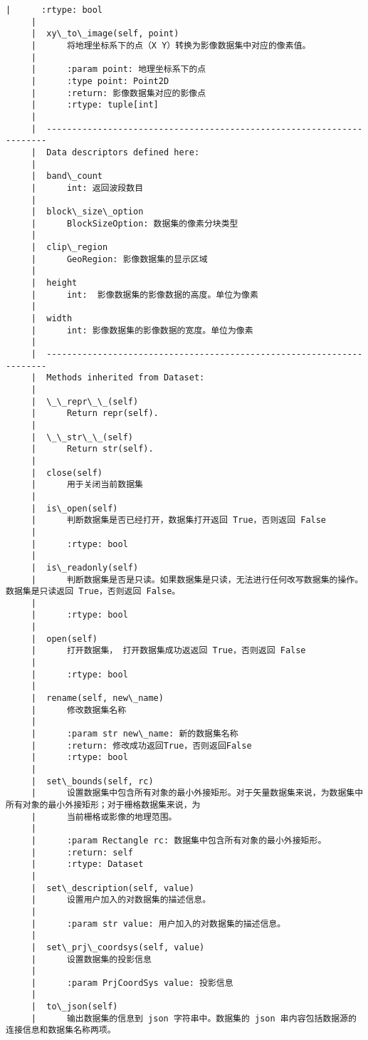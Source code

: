 \documentclass[11pt]{article}
\begin{document}
\begin{Verbatim}[commandchars=\\\{\}]
     |      :rtype: bool
     |  
     |  xy\_to\_image(self, point)
     |      将地理坐标系下的点（X Y）转换为影像数据集中对应的像素值。
     |      
     |      :param point: 地理坐标系下的点
     |      :type point: Point2D
     |      :return: 影像数据集对应的影像点
     |      :rtype: tuple[int]
     |  
     |  ----------------------------------------------------------------------
     |  Data descriptors defined here:
     |  
     |  band\_count
     |      int: 返回波段数目
     |  
     |  block\_size\_option
     |      BlockSizeOption: 数据集的像素分块类型
     |  
     |  clip\_region
     |      GeoRegion: 影像数据集的显示区域
     |  
     |  height
     |      int:  影像数据集的影像数据的高度。单位为像素
     |  
     |  width
     |      int: 影像数据集的影像数据的宽度。单位为像素
     |  
     |  ----------------------------------------------------------------------
     |  Methods inherited from Dataset:
     |  
     |  \_\_repr\_\_(self)
     |      Return repr(self).
     |  
     |  \_\_str\_\_(self)
     |      Return str(self).
     |  
     |  close(self)
     |      用于关闭当前数据集
     |  
     |  is\_open(self)
     |      判断数据集是否已经打开，数据集打开返回 True，否则返回 False
     |      
     |      :rtype: bool
     |  
     |  is\_readonly(self)
     |      判断数据集是否是只读。如果数据集是只读，无法进行任何改写数据集的操作。 数据集是只读返回 True，否则返回 False。
     |      
     |      :rtype: bool
     |  
     |  open(self)
     |      打开数据集， 打开数据集成功返返回 True，否则返回 False
     |      
     |      :rtype: bool
     |  
     |  rename(self, new\_name)
     |      修改数据集名称
     |      
     |      :param str new\_name: 新的数据集名称
     |      :return: 修改成功返回True，否则返回False
     |      :rtype: bool
     |  
     |  set\_bounds(self, rc)
     |      设置数据集中包含所有对象的最小外接矩形。对于矢量数据集来说，为数据集中所有对象的最小外接矩形；对于栅格数据集来说，为
     |      当前栅格或影像的地理范围。
     |      
     |      :param Rectangle rc: 数据集中包含所有对象的最小外接矩形。
     |      :return: self
     |      :rtype: Dataset
     |  
     |  set\_description(self, value)
     |      设置用户加入的对数据集的描述信息。
     |      
     |      :param str value: 用户加入的对数据集的描述信息。
     |  
     |  set\_prj\_coordsys(self, value)
     |      设置数据集的投影信息
     |      
     |      :param PrjCoordSys value: 投影信息
     |  
     |  to\_json(self)
     |      输出数据集的信息到 json 字符串中。数据集的 json 串内容包括数据源的连接信息和数据集名称两项。

\end{Verbatim}
\end{document}
